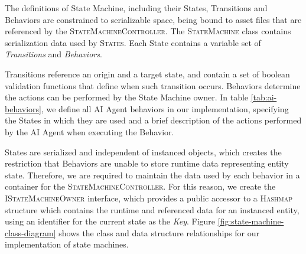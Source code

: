 The definitions of State Machine, including their States, Transitions and Behaviors are constrained to serializable space, being bound to asset files that are referenced by the \textsc{StateMachineController}. The \textsc{StateMachine} class contains serialization data used by \textsc{States}. Each State contains a variable set of \emph{Transitions} and \emph{Behaviors}.

Transitions reference an origin and a target state, and contain a set of boolean validation functions that define when such transition occurs. Behaviors determine the actions can be performed by the State Machine owner. In table \ref{tab:ai-behaviors}, we define all AI Agent behaviors in our implementation, specifying the States in which they are used and a brief description of the actions performed by the AI Agent when executing the Behavior.



States are serialized and independent of instanced objects, which creates the restriction that Behaviors are unable to store runtime data representing entity state. Therefore, we are required to maintain the data used by each behavior in a container for the \textsc{StateMachineController}. For this reason, we create the \textsc{IStateMachineOwner} interface, which provides a public accessor to a \textsc{Hashmap} structure which contains the runtime and referenced data for an instanced entity, using an identifier for the current state as the \emph{Key}. Figure \ref{fig:state-machine-class-diagram} shows the class and data structure relationships for our implementation of state machines. 

